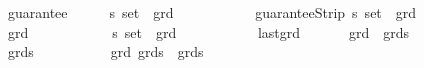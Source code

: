\begin{isabellebody}
\ \ {\isachardoublequoteopen}{\isacharunderscore}guarantee{\isachardoublequoteclose}\ \ \ \ \ {\isacharcolon}{\isacharcolon}\ {\isachardoublequoteopen}{\isacharprime}s\ set\ {\isasymRightarrow}\ grd{\isachardoublequoteclose}\ \ \ \ \ \ \ {\isacharparenleft}{\isachardoublequoteopen}{\isacharunderscore}{\isasymsurd}{\isachardoublequoteclose}\ {\isacharbrackleft}{}{}{}{}{\isacharbrackright}\ {}{}{}{}{\isacharparenright}\isanewline
\ \ {\isachardoublequoteopen}{\isacharunderscore}guaranteeStrip{\isachardoublequoteclose}{\isacharcolon}{\isacharcolon}\ {\isachardoublequoteopen}{\isacharprime}s\ set\ {\isasymRightarrow}\ grd{\isachardoublequoteclose}\ \ \ \ \ \ \ {\isacharparenleft}{\isachardoublequoteopen}{\isacharunderscore}{\isacharhash}{\isachardoublequoteclose}\ {\isacharbrackleft}{}{}{}{}{\isacharbrackright}\ {}{}{}{}{\isacharparenright}\isanewline
\ \ {\isachardoublequoteopen}{\isacharunderscore}grd{\isachardoublequoteclose}\ \ \ \ \ \ \ \ \ \ \ {\isacharcolon}{\isacharcolon}\ {\isachardoublequoteopen}{\isacharprime}s\ set\ {\isasymRightarrow}\ grd{\isachardoublequoteclose}\ \ \ \ \ \ \ {\isacharparenleft}{\isachardoublequoteopen}{\isacharunderscore}{\isachardoublequoteclose}\ {\isacharbrackleft}{}{}{}{}{\isacharbrackright}\ {}{}{}{}{\isacharparenright}\isanewline
\ \ {\isachardoublequoteopen}{\isacharunderscore}last{\isacharunderscore}grd{\isachardoublequoteclose}\ \ \ \ \ \ {\isacharcolon}{\isacharcolon}\ {\isachardoublequoteopen}grd\ {\isasymRightarrow}\ grds{\isachardoublequoteclose}\ \ \ \ \ \ \ \ \ {\isacharparenleft}{\isachardoublequoteopen}{\isacharunderscore}{\isachardoublequoteclose}\ {}{}{}{}{\isacharparenright}\isanewline
\ \ {\isachardoublequoteopen}{\isacharunderscore}grds{\isachardoublequoteclose}\ \ \ \ \ \ \ \ \ \ {\isacharcolon}{\isacharcolon}\ {\isachardoublequoteopen}{\isacharbrackleft}grd{\isacharcomma}\ grds{\isacharbrackright}\ {\isasymRightarrow}\ grds{\isachardoublequoteclose}\ {\isacharparenleft}{\isachardoublequoteopen}{\isacharunderscore}{\isacharcomma}{\isacharslash}\ {\isacharunderscore}{\isachardoublequoteclose}\ {\isacharbrackleft}{}{}{}{\isacharcomma}{}{}{}{}{\isacharbrackright}\ {}{}{}{}{\isacharparenright}\isanewline

\end{isabellebody}
